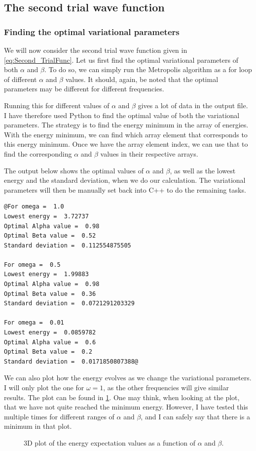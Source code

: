 \documentclass[12pt]{article}
\begin{document}
  
\FloatBarrier
\subsection{The second trial wave function}
\subsubsection{Finding the optimal variational parameters}
We will now consider the second trial wave function given in  \ref{eq:Second_TrialFunc}. Let us first find the optimal variational parameters of both $\alpha$ and $\beta$. To do so, we can simply run the Metropolis algorithm as a for loop of different $\alpha$ and $\beta$ values. It should, again, be noted that the optimal parameters may be different for different frequencies.

Running this for different values of $\alpha$ and $\beta$ gives a lot of data in the output file. I have therefore used Python to find the optimal value of both the variational parameters. The strategy is to find the energy minimum in the array of energies. With the energy minimum, we can find which array element that corresponds to this energy minimum. Once we have the array element index, we can use that to find the corresponding $\alpha$ and $\beta$ values in their respective arrays.

The output below shows the optimal values of $\alpha$ and $\beta$, as well as the lowest energy and the standard deviation, when we do our calculation. The variational parameters will then be manually set back into C++ to do the remaining tasks. 
\begin{lstlisting}
@For omega =  1.0
Lowest energy =  3.72737
Optimal Alpha value =  0.98
Optimal Beta value =  0.52
Standard deviation =  0.112554875505

For omega =  0.5
Lowest energy =  1.99883
Optimal Alpha value =  0.98
Optimal Beta value =  0.36
Standard deviation =  0.0721291203329

For omega =  0.01
Lowest energy =  0.0859782
Optimal Alpha value =  0.6
Optimal Beta value =  0.2
Standard deviation =  0.0171850807388@
\end{lstlisting}
We can also plot how the energy evolves as we change the variational parameters. I will only plot the one for $\omega = 1$, as the other frequencies will give similar results. The plot can be found in \ref{fig:3DPlot_AlphaBeta_Optimal}.  One may think, when looking at the plot, that we have not quite reached the minimum energy. However, I have tested this multiple times for different ranges of $\alpha$ and $\beta$, and I can safely say that there is a minimum in that plot.
\begin{figure}[h]
\centering
\caption{3D plot of the energy expectation values as a function of $\alpha$ and $\beta$.}
\label{fig:3DPlot_AlphaBeta_Optimal}
\end{figure}
\FloatBarrier
\end{document}
